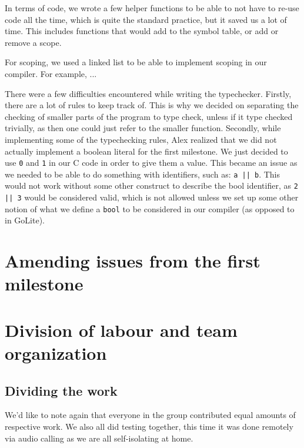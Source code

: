 \documentclass{article}
\begin{document}
In terms of code, we wrote a few helper functions to be able to not have to
re-use code all the time, which is quite the standard practice, but it saved
us a lot of time. This includes functions that would add to the symbol table, or
add or remove a scope.

For scoping, we used a linked list to be able to implement scoping in our compiler.
For example, ... %

There were a few difficulties encountered while writing the typechecker. Firstly,
there are a lot of rules to keep track of. This is why we decided on separating
the checking of smaller parts of the program to type check, unless if it type
checked trivially, as then one could just refer to the smaller function.
Secondly, while implementing some of the typechecking rules, Alex realized that
we did not actually implement a boolean literal for the first milestone. We
just decided to use \verb$0$ and \verb$1$ in our C code in order to give them
a value. This became an issue as we needed to be able to do something with
identifiers, such as: \verb$a || b$. This would not work without some other
construct to describe the bool identifier, as \verb$2 || 3$ would be considered
valid, which is not allowed unless we set up some other notion of what we
define a \verb$bool$ to be considered in our compiler (as opposed to in GoLite).


\section{Amending issues from the first milestone}



\section{Division of labour and team organization}

\subsection{Dividing the work}

 We'd like to note again that everyone in the group contributed equal amounts of
 respective work. We also all did testing together, this time it
 was done remotely via audio calling as we are all self-isolating at home.
\end{document}
